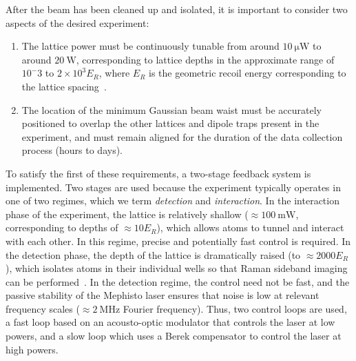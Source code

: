 \documentclass[twocolumn,aps,pra,showpacs,preprintnumbers,bibnotes]{revtex4-1}
\newcommand\unit[2]{\ensuremath{#1~\mathrm{{#2}}}}
\begin{document}
After the beam has been cleaned up and isolated, it is important to consider two aspects of the desired experiment:
\begin{enumerate}
\item The lattice power must be continuously tunable from around \unit{10}{\mu{}W} to around \unit{20}{W}, corresponding to lattice depths in the approximate range of $10^-3$ to $2 \times 10^3 E_R$, where $E_R$ is the geometric recoil energy corresponding to the lattice spacing~\cite{Blatt2015}.
\item The location of the minimum Gaussian beam waist must be accurately positioned to overlap the other lattices and dipole traps present in the experiment, and must remain aligned for the duration of the data collection process (hours to days).
\end{enumerate}
To satisfy the first of these requirements, a two-stage feedback system is implemented.
Two stages are used because the experiment typically operates in one of two regimes, which we term \textit{detection} and \textit{interaction}.
In the interaction phase of the experiment, the lattice is relatively shallow ($\approx \unit{100}{mW}$, corresponding to depths of $\approx 10 E_R$), which allows atoms to tunnel and interact with each other.
In this regime, precise and potentially fast control is required.
In the detection phase, the depth of the lattice is dramatically raised (to $\approx 2000 E_R$), which isolates atoms in their individual wells so that Raman sideband imaging can be performed~\cite{Parsons2015}.
In the detection regime, the control need not be fast, and the passive stability of the Mephisto laser ensures that noise is low at relevant frequency scales ($\approx\unit{2}{MHz}$ Fourier frequency).
Thus, two control loops are used, a fast loop based on an acousto-optic modulator that controls the laser at low powers, and a slow loop which uses a Berek compensator to control the laser at high powers.
\end{document}
